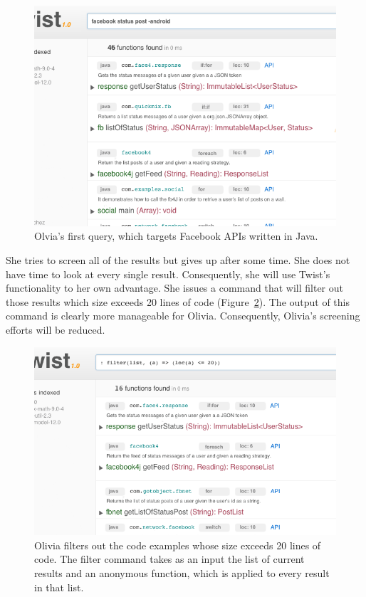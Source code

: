 \begin{figure}[!ht]
    \centering
    \includegraphics[width=\textwidth]{images/twistquery}
    \caption{Olvia's first query, which targets Facebook APIs written in Java.}
    \label{fig:twistquery}
\end{figure}

She tries to screen all of the results but gives up after some time. She does not have time to look at every single result. Consequently, she will use Twist's functionality to her own advantage. She issues a command that will filter out those results which size exceeds 20 lines of code (Figure~\ref{fig:twistslash}). The output of this command is clearly more manageable for Olivia. Consequently, Olivia's screening efforts will be reduced.

\begin{figure}[!ht]
    \centering
    \includegraphics[width=\textwidth]{images/twistslash}
    \caption{Olivia filters out the code examples whose size exceeds 20 lines of code. The 
	 filter command takes as an input the list of current results and an anonymous function, 
	 which is applied to every result in that list.}
    \label{fig:twistslash}
\end{figure}  

